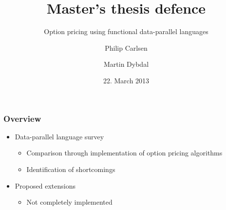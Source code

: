 \documentclass{beamer}
\title{Master's thesis defence}
\subtitle{Option pricing using functional data-parallel languages}
\author{Philip Carlsen \and Martin Dybdal}
\date{22. March 2013}
\institute{Computer Science\\
University of Copenhagen}
\begin{document}
\frame{\titlepage}


\begin{frame}
  \frametitle{Overview}

  \begin{itemize}
  \item<1-> Data-parallel language survey
    \begin{itemize}
    \item Comparison through implementation of option pricing
      algorithms
    \item Identification of shortcomings
    \end{itemize}
  \item<2-> Proposed extensions
    \begin{itemize}
    \item Not completely implemented
    \end{itemize}
  \end{itemize}
\end{frame}
\end{document}
